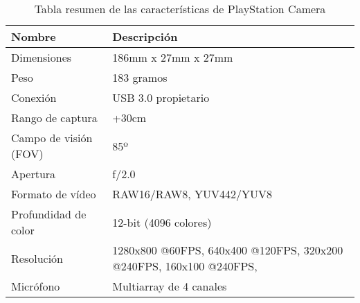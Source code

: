 \begin{table}[!ht]
\begin{center}
\begin{tabular}{|p{60mm}|p{100mm}|} \hline 
\textbf{Nombre} & \textbf{Descripción} \\ \hline
Dimensiones
&
186mm x 27mm x 27mm
\\
\hline

Peso
&
183 gramos
\\
\hline

Conexión
&
USB 3.0 propietario
\\
\hline

Rango de captura
&
+30cm
\\
\hline

Campo de visión (FOV)
&
85º
\\
\hline

Apertura
&
f/2.0
\\
\hline

Formato de vídeo
&
RAW16/RAW8, YUV442/YUV8
\\
\hline

Profundidad de color
&
12-bit (4096 colores)
\\
\hline

Resolución
&
1280x800 @60FPS,
640x400 @120FPS,
320x200 @240FPS,
160x100 @240FPS,
\\
\hline

Micrófono
&
Multiarray de 4 canales
\\
\hline

\end{tabular}
\end{center}
\caption{Tabla resumen de las características de PlayStation Camera}
\label{table:playstation-camera}
\end{table}
